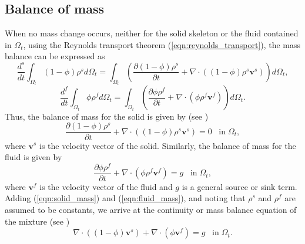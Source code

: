 \subsection{Balance of mass}
When no mass change occurs, neither for the solid skeleton or the fluid contained in $\Omega_{t}$, using the Reynolds transport theorem (\ref{eqn:reynolds_transport}), the mass balance can be expressed as
\begin{equation*}
\frac{d^{s}}{dt}\int_{\Omega_{t}}(1-\phi)\rho^{s}  d \Omega_{t} = \int_{\Omega_{t}} \left( \frac{\partial (1-\phi)\rho^{s} }{\partial t} + \nabla \cdot ( (1-\phi)\rho^{s}\boldsymbol{v}^{s}) \right) d \Omega_{t},
\end{equation*}
\begin{equation*}
\frac{d^{f}}{dt}\int_{\Omega_{t}}\phi\rho^{f}  d \Omega_{t} = \int_{\Omega_{t}} \left( \frac{\partial \phi\rho^{f} }{\partial t} + \nabla \cdot ( \phi\rho^{f} \boldsymbol{v}^{f}) \right) d \Omega_{t}.
\end{equation*}
Thus, the balance of mass for the solid is given by (see \citet[eqn. (8.57)]{boer2005trends})
\begin{equation}
\frac{\partial (1-\phi)\rho^{s} }{\partial t} + \nabla \cdot ( (1-\phi)\rho^{s}\boldsymbol{v}^{s})=0 \;\;\;\mbox{in}\;\Omega_{t},
\label{eqn:solid_mass}
\end{equation}
where $\boldsymbol{v}^{s}$ is the velocity vector of the solid. Similarly, the balance of mass for the fluid is given by
\begin{equation}
\frac{\partial \phi\rho^{f} }{\partial t} + \nabla \cdot ( \phi\rho^{f} \boldsymbol{v}^{f})=g \;\;\;\mbox{in}\;\Omega_{t},
\label{eqn:fluid_mass}
\end{equation}
where $\boldsymbol{v}^{f}$ is the velocity vector of the fluid and $g$ is a general source or sink term. Adding (\ref{eqn:solid_mass}) and (\ref{eqn:fluid_mass}), and noting that $\rho^{s}$ and $\rho^{f}$ are assumed to be constants,  we arrive at the continuity or mass balance equation of the mixture (see \citet[eqn. (8.59)]{boer2005trends}) 
\begin{equation}
\nabla \cdot((1-\phi) \boldsymbol{v}^{s}) + \nabla \cdot (\phi \boldsymbol{v}^f)=g \;\;\;\mbox{in}\;\Omega_{t}.
\label{eqn:continuity}
\end{equation}



